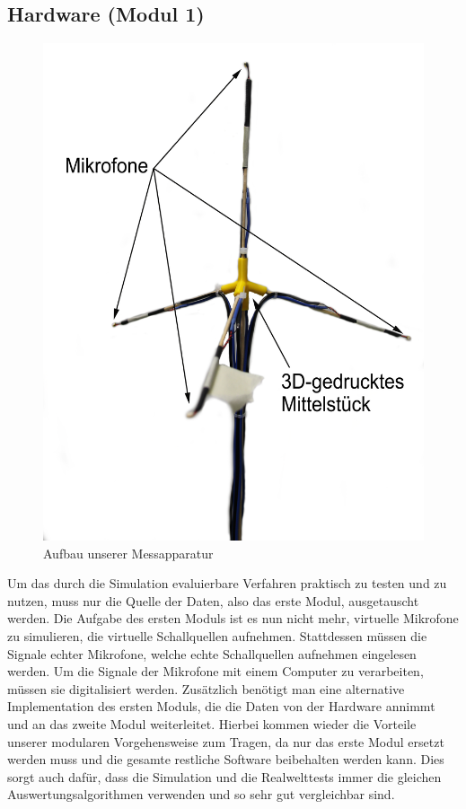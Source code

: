 \subsection{Hardware (Modul 1)} 
\begin{figure}
	\centering
	\includegraphics[width=\linewidth]{img/tet}
	\caption{Aufbau unserer Messapparatur}
	\label{tet}
	\vspace{-1cm}
\end{figure}
Um das durch die Simulation evaluierbare Verfahren praktisch zu testen und zu nutzen, muss nur die Quelle der Daten, also das erste Modul, ausgetauscht werden. Die Aufgabe des ersten Moduls ist es nun nicht mehr, virtuelle Mikrofone  zu simulieren, die virtuelle Schallquellen aufnehmen. Stattdessen müssen die Signale echter Mikrofone, welche echte Schallquellen aufnehmen eingelesen werden. Um die Signale der Mikrofone mit einem Computer zu verarbeiten, müssen sie digitalisiert werden. Zusätzlich benötigt man eine alternative Implementation des ersten Moduls, die die Daten von der Hardware annimmt und an das zweite Modul weiterleitet. Hierbei kommen wieder die Vorteile unserer modularen Vorgehensweise zum Tragen, da nur das erste Modul ersetzt werden muss und die gesamte restliche Software beibehalten werden kann. Dies sorgt auch dafür, dass die Simulation und die Realwelttests immer die gleichen Auswertungsalgorithmen verwenden und so sehr gut vergleichbar sind.
